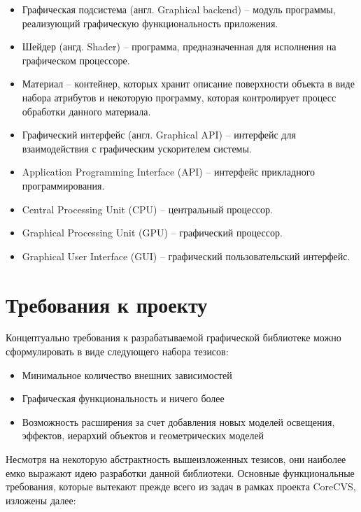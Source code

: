 \documentclass[14pt]{matmex-diploma}
\begin{document}
\begin{itemize}
    \item Графическая подсистема (англ. Graphical backend) -- модуль программы, реализующий графическую функциональность приложения.
    \item Шейдер (ангд. Shader) -- программа, предназначенная для исполнения на графическом процессоре.
    \item Материал -- контейнер, которых хранит описание поверхности объекта в виде набора атрибутов и некоторую программу, которая контролирует процесс обработки данного материала.
    \item Графический интерфейс (англ. Graphical API) -- интерфейс для взаимодействия с графическим ускорителем системы.
    \item Application Programming Interface (API) -- интерфейс прикладного программирования.
    \item Central Processing Unit (CPU) -- центральный процессор.
    \item Graphical Processing Unit (GPU) -- графический процессор.
    \item Graphical User Interface (GUI) -- графический пользовательский интерфейс.
\end{itemize}


\section{Требования к проекту}

Концептуально требования к разрабатываемой графической библиотеке можно сформулировать в виде следующего набора тезисов:

\begin{itemize}
    \item Минимальное количество внешних зависимостей
    \item Графическая функциональность и ничего более
    \item Возможность расширения за счет добавления новых моделей освещения, эффектов, иерархий объектов и геометрических моделей 
\end{itemize}

Несмотря на некоторую абстрактность вышеизложенных тезисов, они наиболее емко выражают идею разработки данной библиотеки. Основные функциональные требования, которые вытекают прежде всего из задач в рамках проекта CoreCVS, изложены далее:
\end{document}
